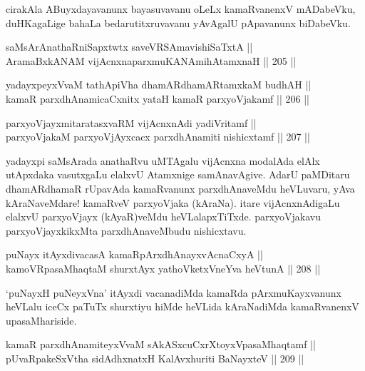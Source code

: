 \begin{artha}
cirakAla ABuyxdayavanunx bayasuvavanu oLeLx kamaRvanenxV mADabeVku,
duHKagaLige bahaLa bedarutitxruvavanu yAvAgalU pApavanunx biDabeVku.
\end{artha}


\begin{shl}
saMsArAnathaRniSapxtwtx saveVRSAmavishiSaTxtA || \\
AramaBxkANAM vijAcnxnaparxmuKANAmihA\s \s tamxnaH \hfill || 205 ||  
\end{shl}

\begin{shl}
yadayxpeyxVvaM tathA\s piVha dhamARdhamARtamxkaM budhAH || \\
kamaR parxdhAnamicaCxnitx yataH kamaR parxyoVjakamf \hfill || 206 ||  
\end{shl}

\begin{shl}
parxyoVjayxmitaratasxvaRM vijAcnxnAdi yadiVritamf ||  \\
parxyoVjakaM parxyoVjAyxcacx parxdhAnamiti nishicxtamf \hfill || 207 ||  
\end{shl}

\begin{artha}
yadayxpi saMsArada anathaRvu uMTAgalu vijAcnxna modalAda elAlx
utApxdaka vasutxgaLu elalxvU Atamxnige samAnavAgive. AdarU paMDitaru
dhamARdhamaR rUpavAda kamaRvanunx parxdhAnaveMdu heVLuvaru, yAva
kAraNaveMdare! kamaRveV parxyoVjaka (kAraNa). itare vijAcnxnAdigaLu
elalxvU parxyoVjayx (kAyaR)veMdu heVLalapxTiTxde. parxyoVjakavu
parxyoVjayxkikxMta parxdhAnaveMbudu nishicxtavu.
\end{artha}

\begin{shl}
puNayx itAyxdivacasA kamaRpArxdhAnayxvAcnaCxyA || \\
kamoVRpasaMhaqtaM shurxtAyx yathoVketxVneYva heVtunA \hfill || 208 ||  
\end{shl}

\begin{artha}
`puNayxH puNeyxVna' itAyxdi vacanadiMda kamaRda pArxmuKayxvanunx
heVLalu iceCx paTuTx shurxtiyu hiMde heVLida kAraNadiMda
kamaRvanenxV upasaMhariside.
\end{artha}

\begin{shl}
kamaR parxdhAnamiteyxVvaM sAkASxcuCxrXtoyxVpasaMhaqtamf || \\
pUvaRpakeSxV\s tha sidAdhxnatxH KalAvxhuriti BaNayxteV \hfill || 209 ||  
\end{shl}

